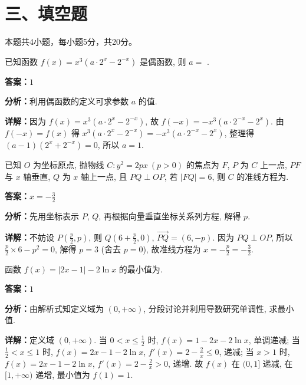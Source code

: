 \section*{三、填空题}
本题共4小题，每小题5分，共20分。

\begin{question}[points=5]
已知函数 $f(x) = x^3(a \cdot 2^x - 2^{-x})$ 是偶函数, 则 $a =$ .
\fillin[{$1$}]
\begin{solution}
\textbf{答案：}$1$

\textbf{分析：}利用偶函数的定义可求参数 $a$ 的值.

\textbf{详解：}因为 $f(x) = x^3(a \cdot 2^x - 2^{-x})$, 故 $f(-x) = -x^3(a \cdot 2^{-x} - 2^x)$. 由 $f(-x) = f(x)$ 得 $x^3(a \cdot 2^x - 2^{-x}) = -x^3(a \cdot 2^{-x} - 2^x)$, 整理得 $(a-1)(2^x + 2^{-x}) = 0$, 所以 $a = 1$.
\end{solution}
\end{question}

\begin{question}[points=5]
已知 $O$ 为坐标原点, 抛物线 $C: y^2 = 2px \ (p > 0)$ 的焦点为 $F$, $P$ 为 $C$ 上一点, $PF$ 与 $x$ 轴垂直, $Q$ 为 $x$ 轴上一点, 且 $PQ \perp OP$, 若 $|FQ| = 6$, 则 $C$ 的准线方程为.
\fillin[{$x = -\frac{3}{2}$}]
\begin{solution}
\textbf{答案：}$x = -\frac{3}{2}$

\textbf{分析：}先用坐标表示 $P$, $Q$, 再根据向量垂直坐标关系列方程, 解得 $p$.

\textbf{详解：}不妨设 $P\left(\frac{p}{2}, p\right)$, 则 $Q\left(6 + \frac{p}{2}, 0\right)$, $\overrightarrow{PQ} = (6, -p)$. 因为 $PQ \perp OP$, 所以 $\frac{p}{2} \times 6 - p^2 = 0$, 解得 $p = 3$ (舍去 $p=0$), 故准线方程为 $x = -\frac{p}{2} = -\frac{3}{2}$.
\end{solution}
\end{question}

\begin{question}[points=5]
函数 $f(x) = |2x - 1| - 2\ln x$ 的最小值为.
\fillin[{$1$}]
\begin{solution}
\textbf{答案：}$1$

\textbf{分析：}由解析式知定义域为 $(0, +\infty)$, 分段讨论并利用导数研究单调性, 求最小值.

\textbf{详解：}定义域 $(0, +\infty)$. 当 $0 < x \leq \frac{1}{2}$ 时, $f(x) = 1 - 2x - 2\ln x$, 单调递减; 当 $\frac{1}{2} < x \leq 1$ 时, $f(x) = 2x - 1 - 2\ln x$, $f'(x) = 2 - \frac{2}{x} \leq 0$, 递减; 当 $x > 1$ 时, $f(x) = 2x - 1 - 2\ln x$, $f'(x) = 2 - \frac{2}{x} > 0$, 递增. 故 $f(x)$ 在 $(0,1]$ 递减, 在 $[1, +\infty)$ 递增, 最小值为 $f(1) = 1$.
\end{solution}
\end{question}


